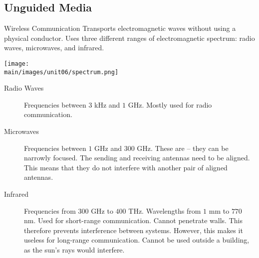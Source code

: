 \documentclass[\main/notes.tex]{subfiles}
\begin{document}
			\subsection{Unguided Media}
				\begin{definition}{Wireless Communication}
					Transports electromagnetic waves without using a physical conductor. Uses three different ranges of electromagnetic spectrum: radio waves, microwaves, and infrared.
					\begin{center}
						\texttt{[image: \\main/images/unit06/spectrum.png]}
					\end{center}
				\end{definition}
				\begin{description}
					\item[Radio Waves] Frequencies between $3$ kHz and $1$ GHz. Mostly used for radio communication.
					\item[Microwaves] Frequencies between $1$ GHz and $300$ GHz. These are  -- they can be narrowly focused. The sending and receiving antennas need to be aligned. This means that they do not interfere with another pair of aligned antennas.
					\item[Infrared] Frequencies from $300$ GHz to $400$ THz. Wavelengths from $1$ mm to $770$ nm. Used for short-range communication. Cannot penetrate walls. This therefore prevents interference between systems. However, this makes it useless for long-range communication. Cannot be used outside a building, as the sun's rays would interfere.
				\end{description}
\end{document}
